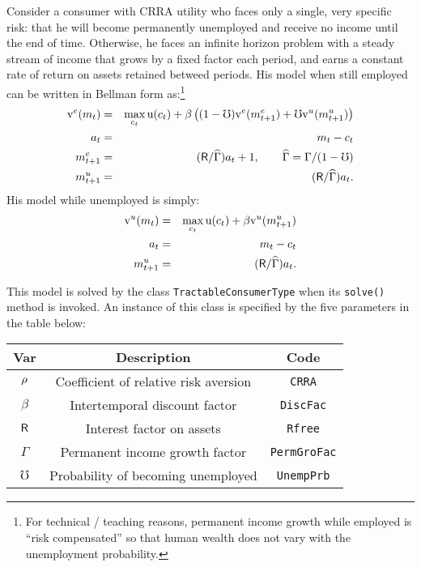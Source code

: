\documentclass[12pt,titlepage,letterpaper]{econtex}
\begin{document}
Consider a consumer with CRRA utility who faces only a single, very specific risk: that he will become permanently unemployed and receive no income until the end of time.  Otherwise, he faces an infinite horizon problem with a steady stream of income that grows by a fixed factor each period, and earns a constant rate of return on assets retained betweed periods.  His model when still employed can be written in Bellman form as:\footnote{For technical / teaching reasons, permanent income growth while employed is ``risk compensated'' so that human wealth does not vary with the unemployment probability.}
\begin{eqnarray*}
\mathrm{v}^e(m_t) &=& \max_{c_t} \mathrm{u}(c_t) + \beta  \left( (1-\mho)\mathrm{v}^e(m^e_{t+1}) + \mho \mathrm{v}^u(m^u_{t+1}) \right) \\
a_t &=& m_t - c_t \\
m^e_{t+1} &=& (\mathsf{R}/\widehat{\Gamma}) a_t + 1, \qquad \widehat{\Gamma} = \Gamma/(1-\mho)\\
m^u_{t+1} &=& (\mathsf{R}/\widehat{\Gamma}) a_t.
\end{eqnarray*}
His model while unemployed is simply:
\begin{eqnarray*}
\mathrm{v}^u(m_t) &=& \max_{c_t} \mathrm{u}(c_t) + \beta  \mathrm{v}^u(m^u_{t+1}) \\
a_t &=& m_t - c_t \\
m^u_{t+1} &=& (\mathsf{R}/\widehat{\Gamma}) a_t.
\end{eqnarray*}

This model is solved by the class \texttt{TractableConsumerType} when its \texttt{solve()} method is invoked.  An instance of this class is specified by the five parameters in the table below:
\begin{table}[h!]
\centering
\begin{tabular}{c c c}
Var & Description & Code \\
\hline
$\rho$ & Coefficient of relative risk aversion & \texttt{CRRA} \\
$\beta$ & Intertemporal discount factor & \texttt{DiscFac} \\
$\mathsf{R}$ & Interest factor on assets & \texttt{Rfree} \\
$\Gamma$ & Permanent income growth factor & \texttt{PermGroFac} \\
$\mho$ & Probability of becoming unemployed & \texttt{UnempPrb}
\end{tabular}
\end{table}
\end{document}
